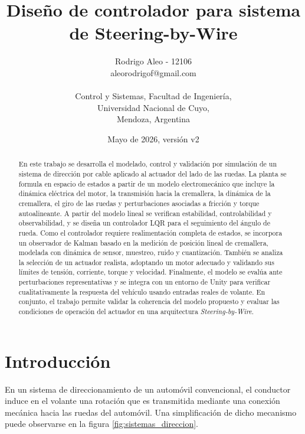 \documentclass{article}
\title{Diseño de controlador para sistema de Steering-by-Wire}
\author{Rodrigo Aleo - 12106\\ aleorodrigof@gmail.com \\ \\ Control y Sistemas, Facultad de Ingeniería, \\ Universidad Nacional de Cuyo, \\ Mendoza, Argentina}
\date{Mayo de 2026, versión v2}
\begin{document}
\renewcommand{\tablename}{Tabla}

\maketitle

\begin{abstract}
    En este trabajo se desarrolla el modelado, control y validación por simulación de un sistema de dirección por cable aplicado al actuador del lado de las ruedas. La planta se formula en espacio de estados a partir de un modelo electromecánico que incluye la dinámica eléctrica del motor, la transmisión hacia la cremallera, la dinámica de la cremallera, el giro de las ruedas y perturbaciones asociadas a fricción y torque autoalineante. A partir del modelo lineal se verifican estabilidad, controlabilidad y observabilidad, y se diseña un controlador LQR para el seguimiento del ángulo de rueda. Como el controlador requiere realimentación completa de estados, se incorpora un observador de Kalman basado en la medición de posición lineal de cremallera, modelada con dinámica de sensor, muestreo, ruido y cuantización. También se analiza la selección de un actuador realista, adoptando un motor adecuado y validando sus límites de tensión, corriente, torque y velocidad. Finalmente, el modelo se evalúa ante perturbaciones representativas y se integra con un entorno de Unity para verificar cualitativamente la respuesta del vehículo usando entradas reales de volante. En conjunto, el trabajo permite validar la coherencia del modelo propuesto y evaluar las condiciones de operación del actuador en una arquitectura \textit{Steering-by-Wire}.
\end{abstract}

\section{Introducción}
\label{sec:intro}


En un sistema de direccionamiento de un automóvil convencional, el conductor induce en el volante una rotación que es transmitida mediante una conexión mecánica hacia las ruedas del automóvil. Una simplificación de dicho mecanismo puede observarse en la figura \ref{fig:sistemas_direccion}.
\end{document}
